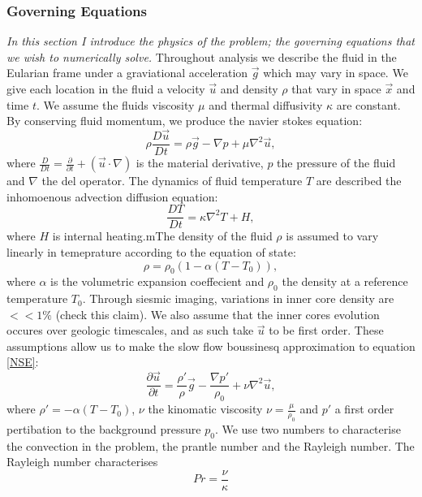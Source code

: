 \documentclass{article}
\begin{document}
\subsubsection*{Governing Equations}
{\it{In this section I introduce the physics of the problem; the governing equations that we wish to numerically solve.}}
\vspace{0.3cm}
\newline
\noindent Throughout analysis we describe the fluid in the Eularian frame under a graviational acceleration $\vec{g}$ which may vary in space. We give each location in the fluid a velocity $\vec{u}$ and density $\rho$ that vary in space $\vec{x}$ and time $t$. We assume the fluids viscosity $\mu$ and  thermal diffusivity $\kappa$ are constant. By conserving fluid momentum, we produce the navier stokes equation:
\begin{equation}
	\rho \frac{D \vec{u}}{D t} = \rho \vec{g} - \nabla p + \mu \nabla^2 \vec{u},
	\label{NSE}
\end{equation}
where $\frac{D}{D t} = \frac{\partial }{\partial t} + (\vec{u} \cdot \nabla)$ is the material derivative, $p$ the pressure of the fluid and $\nabla$ the del operator. The dynamics of fluid temperature $T$ are described the inhomoenous advection diffusion equation:
\begin{equation}
	\frac{D T}{D t} = \kappa \nabla^2 T + H,
	\label{adeT}
\end{equation}
where $H$ is internal heating.mThe density of the fluid $\rho$ is assumed to vary linearly in temeprature according to the equation of state:
\begin{equation}
	\rho = \rho_0 (1- \alpha(T - T_0)),
	\label{equation of state}
\end{equation}
where $\alpha$ is the volumetric expansion coeffecient and $\rho_0$ the density at a reference temperature $T_0$.
Through siesmic imaging, variations in inner core density are $<< 1 \%$ (check this claim). We also assume that the inner cores evolution occures over geologic timescales, and as such take $\vec{u}$ to be first order. These assumptions allow us to make the slow flow boussinesq approximation to equation \ref{NSE}:
\begin{equation}
	\frac{\partial \vec{u}}{\partial t} = \frac{\rho'}{\rho} \vec{g} -   \frac{\nabla p'}{\rho_0} + \nu \nabla^2 \vec{u},
	\label{NSE slow + boussinesq}
\end{equation}
where $\rho'=-\alpha(T - T_0)$, $\nu$ the kinomatic viscosity $\nu = \frac{\mu}{\rho_0}$ and $p'$ a first order pertibation to the background pressure $p_0$. 
\newline
We use two numbers to characterise the convection in the problem, the prantle number and the Rayleigh number. The Rayleigh number characterises 
\begin{equation}
	Pr = \frac{\nu}{\kappa}
\end{equation}
\end{document}

